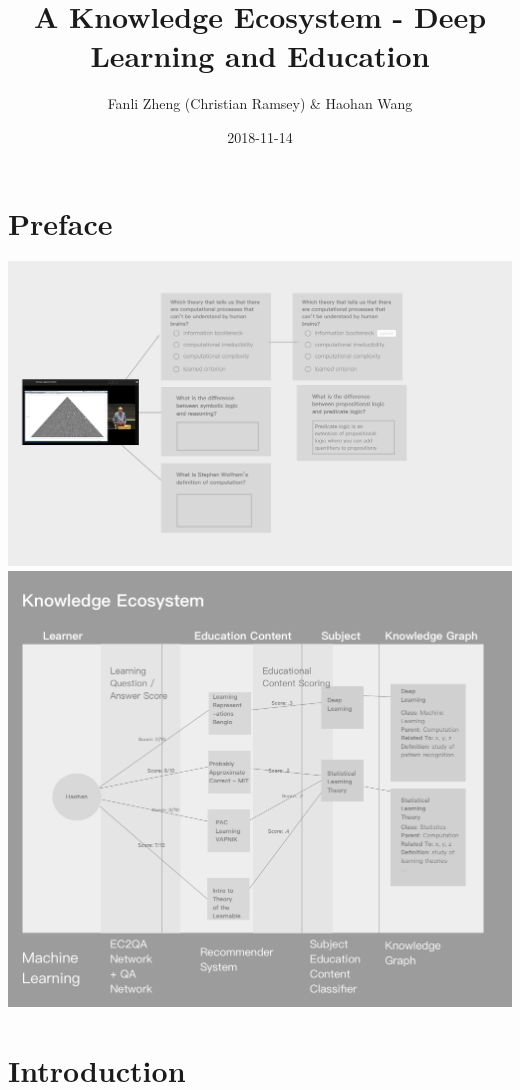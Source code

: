 \documentclass[]{book}
\title{A Knowledge Ecosystem - Deep Learning and Education}
\author{Fanli Zheng (Christian Ramsey) \& Haohan Wang}
\date{2018-11-14}
\theoremstyle{definition}
\theoremstyle{definition}
\theoremstyle{definition}
\theoremstyle{remark}
\begin{document}
\maketitle

{
\hypersetup{linkcolor=black}
\setcounter{tocdepth}{1}
\tableofcontents
}
\chapter*{Preface}\label{preface}

\includegraphics{img/MtoQA.png}
\includegraphics{img/knowledgeEcosystem.png}

\chapter{Introduction}\label{introduction}
\end{document}
